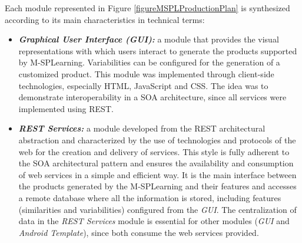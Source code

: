 Each module represented in Figure \ref{figureMSPLProductionPlan} is synthesized according to its main characteristics in technical terms:

\begin{itemize}
	\item \textbf{\textit{Graphical User Interface (GUI):}} a module that provides the visual representations with which users interact to generate the products supported by M-SPLear\allowbreak ning. Variabilities can be configured for the generation of a customized product. This module was implemented through client-side technologies, especially HTML, JavaScript and CSS. The idea was to demonstrate interoperability in a SOA architecture, since all services were implemented using REST.
	
	\item \textbf{\textit{REST Services:}} a module developed from the REST architectural abstraction and characterized by the use of technologies and protocols of the web for the creation and delivery of services. This style is fully adherent to the SOA architectural pattern and ensures the availability and consumption of web services in a simple and efficient way. It is the main interface between the products generated by the M-SPLear\allowbreak ning and their features and accesses a remote database where all the information is stored, including features (similarities and variabilities) configured from the \textit{GUI}. The centralization of data in the \textit{REST Services} module is essential for other modules (\textit{GUI} and \textit{Android Template}), since both consume the web services provided.
	

\end{itemize}
